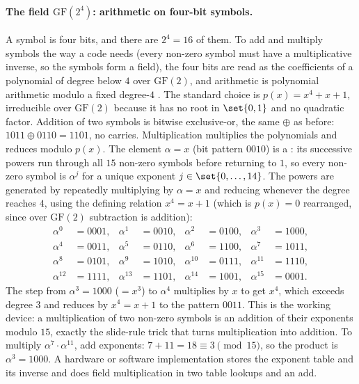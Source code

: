 \paragraph{The field \texorpdfstring{$\mathrm{GF}(2^{4})$}{GF(16)}:
arithmetic on four-bit symbols.}
A symbol is four bits, and there are $2^{4} = 16$ of them. To add and
multiply symbols the way a code needs (every non-zero symbol must have
a multiplicative inverse, so the symbols form a field), the four bits
are read as the coefficients of a polynomial of degree below $4$ over
$\mathrm{GF}(2)$, and arithmetic is polynomial arithmetic modulo a
fixed degree-$4$ . The standard
choice is $p(x) = x^{4} + x + 1$, irreducible over $\mathrm{GF}(2)$
because it has no root in $\set{0, 1}$ and no quadratic factor.
Addition of two symbols is bitwise exclusive-or, the same $\oplus$ as
before: $1011 \oplus 0110 = 1101$, no carries. Multiplication
multiplies the polynomials and reduces modulo $p(x)$. The element
$\alpha = x$ (bit pattern $0010$) is a :
its successive powers run through all $15$ non-zero symbols before
returning to $1$, so every non-zero symbol is $\alpha^{j}$ for a
unique exponent $j \in \set{0, \ldots, 14}$. The powers are generated
by repeatedly multiplying by $\alpha = x$ and reducing whenever the
degree reaches $4$, using the defining relation $x^{4} = x + 1$ (which
is $p(x) = 0$ rearranged, since over $\mathrm{GF}(2)$ subtraction is
addition):
\[
\begin{aligned}
\alpha^{0} &= 0001, & \alpha^{1} &= 0010, & \alpha^{2} &= 0100, &
\alpha^{3} &= 1000, \\
\alpha^{4} &= 0011, & \alpha^{5} &= 0110, & \alpha^{6} &= 1100, &
\alpha^{7} &= 1011, \\
\alpha^{8} &= 0101, & \alpha^{9} &= 1010, & \alpha^{10} &= 0111, &
\alpha^{11} &= 1110, \\
\alpha^{12} &= 1111, & \alpha^{13} &= 1101, & \alpha^{14} &= 1001, &
\alpha^{15} &= 0001.
\end{aligned}
\]
The step from $\alpha^{3} = 1000$ ($= x^{3}$) to $\alpha^{4}$
multiplies by $x$ to get $x^{4}$, which exceeds degree $3$ and reduces
by $x^{4} = x + 1$ to the pattern $0011$. This  is
the working device: a multiplication of two non-zero symbols is an
addition of their exponents modulo $15$, exactly the slide-rule trick
that turns multiplication into addition. To multiply $\alpha^{7}
\cdot \alpha^{11}$, add exponents: $7 + 11 = 18 \equiv 3 \pmod{15}$,
so the product is $\alpha^{3} = 1000$. A hardware or software
implementation stores the exponent table and its inverse and does
field multiplication in two table lookups and an add.

